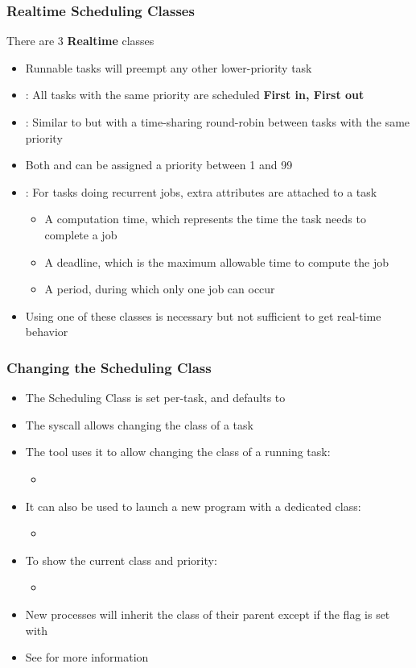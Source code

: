 \begin{frame}
	\frametitle{Realtime Scheduling Classes}
	There are 3 \textbf{Realtime} classes
	\begin{itemize}
		\item Runnable tasks will preempt any other lower-priority task
		\item {}: All tasks with the same priority are scheduled \textbf{First in, First out}
		\item {}: Similar to  but with a time-sharing round-robin between tasks with the same priority
		\item Both  and  can be assigned a priority between 1 and 99
		\item {}: For tasks doing recurrent jobs, extra attributes are attached to a task
			\begin{itemize}
				\item A computation time, which represents the time the task needs to complete a job
				\item A deadline, which is the maximum allowable time to compute the job
				\item A period, during which only one job can occur
			\end{itemize}
		\item Using one of these classes is necessary but not sufficient to get real-time behavior
	\end{itemize}
\end{frame}

\begin{frame}
	\frametitle{Changing the Scheduling Class}
	\begin{itemize}
		\item The Scheduling Class is set per-task, and defaults to 
		\item The  syscall allows changing the class of a task
		\item The  tool uses it to allow changing the class of a running task:
			\begin{itemize}
				\item {}
			\end{itemize}
		\item It can also be used to launch a new program with a dedicated class:
			\begin{itemize}
				\item {}
			\end{itemize}
		\item To show the current class and priority:
			\begin{itemize}
				\item {}
			\end{itemize}
		\item New processes will inherit the class of their parent except if the  flag is set with 
		\item See  for more information
	\end{itemize}
\end{frame}
